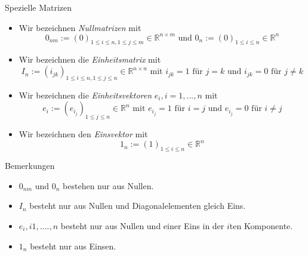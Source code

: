 \documentclass[
  8pt,
  ignorenonframetext,
]{beamer}
\providecommand{\tightlist}{%
  \setlength{\itemsep}{0pt}\setlength{\parskip}{0pt}}
\begin{document}
\begin{frame}{Spezielle Matrizen}
\protect\hypertarget{spezielle-matrizen}{}
\footnotesize
\begin{definition}
\begin{itemize}
\item Wir bezeichnen \textit{Nullmatrizen} mit
\begin{equation}
0_{nm} := (0)_{1 \le i \le n, 1 \le j \le m} \in \mathbb{R}^{n \times m}
\mbox{ und }
0_{n} := (0)_{1 \le i \le n} \in \mathbb{R}^{n}
\end{equation}
\item Wir bezeichnen die \textit{Einheitsmatrix} mit
\begin{equation}
I_{n} := (i_{jk})_{1 \le i \le n, 1 \le j \le n} \in \mathbb{R}^{n \times n} \mbox{ mit } i_{jk} = 1 \mbox{ für } j = k \mbox{ und } i_{jk} = 0 \mbox{ für } j \neq k
\end{equation}
\item Wir bezeichnen die \textit{Einheitsvektoren} $e_i, i = 1,...,n$ mit
\begin{equation}
e_{i} := (e_{{i}_j})_{1 \le j \le n} \in \mathbb{R}^{n} \mbox{ mit } e_{{i}_j} = 1 \mbox{ für } i = j \mbox{ und } e_{{i}_j} = 0 \mbox{ für } i \neq j
\end{equation}
\item Wir bezeichnen den \textit{Einsvektor} mit
\begin{equation}
1_n := (1)_{1 \le i \le n} \in \mathbb{R}^n
\end{equation}
\end{itemize}
\end{definition}

Bemerkungen

\begin{itemize}
\tightlist
\item
  \(0_{nm}\) und \(0_{n}\) bestehen nur aus Nullen.
\item
  \(I_{n}\) besteht nur aus Nullen und Diagonalelementen gleich Eins.
\item
  \(e_i, i 1,....,n\) besteht nur aus Nullen und einer Eins in der
  \(i\)ten Komponente.
\item
  \(1_n\) besteht nur aus Einsen.
\end{itemize}
\end{frame}
\end{document}
